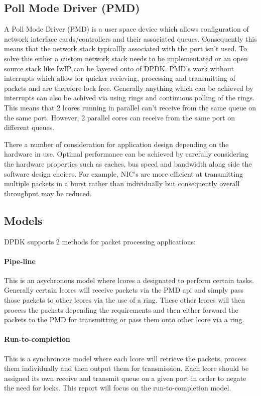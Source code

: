 \documentclass[final_report.tex]{subfiles}
\begin{document}
\subsection{Poll Mode Driver (PMD)}
A Poll Mode Driver (PMD) is a user space device which allows configuration of network interface cards/controllers and their associated queues. Consequently this means that the network stack typicallly associated with the port isn't used. To solve this either a custom network stack needs to be implementated or an open source stack like IwIP  can be layered onto of DPDK. PMD's work without interrupts which allow for quicker recieving, processing and transmitting of packets and are therefore lock free. Generally anything which can be achieved by interrupts can also be achived via using rings and continuous polling of the rings. This means that 2 lcores running in parallel can't receive from the same queue on the same port. However, 2 parallel cores can receive from the same port on different queues.

There a number of consideration for application design depending on the hardware in use. Optimal performance can be achieved by carefully considering the hardware properties such as caches, bus speed and bandwidth along side the software design choices. For example, NIC's are more efficient at transmitting multiple packets in a burst rather than individually but consequently overall throughput may be reduced.

\subsection{Models}
DPDK supports 2 methods for packet processing applications:

\paragraph*{Pipe-line}
This is an asychronous model where lcores a designated to perform certain tasks. Generally certain lcores will receive packets via the PMD api and simply pass those packets to other lcores via the use of a ring. These other lcores will then process the packets depending the requirements and then either forward the packets to the PMD for transmitting or pass them onto other lcore via a ring.

\paragraph*{Run-to-completion}
This is a synchronous model where each lcore will retrieve the packets, process them individually and then output them for transmission. Each lcore should be assigned its own receive and transmit queue on a given port in order to negate the need for locks. This report will focus on the run-to-completion model.
\end{document}
